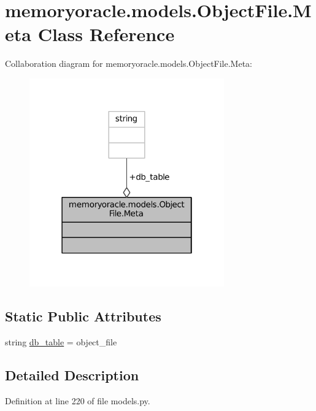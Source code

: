 \hypertarget{classmemoryoracle_1_1models_1_1ObjectFile_1_1Meta}{}\section{memoryoracle.\+models.\+Object\+File.\+Meta Class Reference}
\label{classmemoryoracle_1_1models_1_1ObjectFile_1_1Meta}


Collaboration diagram for memoryoracle.\+models.\+Object\+File.\+Meta\+:\nopagebreak
\begin{figure}[H]
\begin{center}
\leavevmode
\includegraphics[width=238pt]{classmemoryoracle_1_1models_1_1ObjectFile_1_1Meta__coll__graph}
\end{center}
\end{figure}
\subsection*{Static Public Attributes}
\begin{DoxyCompactItemize}
\item 
string \hyperlink{classmemoryoracle_1_1models_1_1ObjectFile_1_1Meta_a3920ab6408e0c273a3a5d50ff02654c3}{db\+\_\+table} = \textquotesingle{}object\+\_\+file\textquotesingle{}
\end{DoxyCompactItemize}


\subsection{Detailed Description}


Definition at line 220 of file models.\+py.



